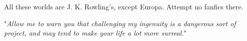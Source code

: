 All these worlds are J. K. Rowling’s, except Europa. Attempt no fanfics there.

"\emph{Allow me to warn you that challenging my ingenuity is a dangerous sort of project, and may tend to make your life a lot more surreal.}"

